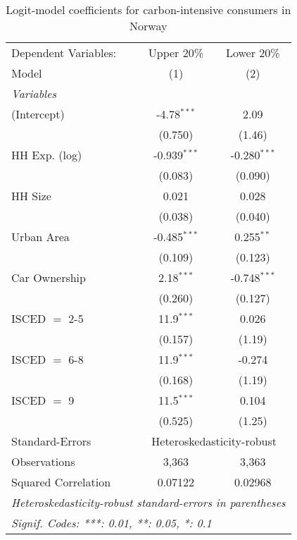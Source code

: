 
\begin{table}[htbp!]
   \centering
   \small
   \begin{adjustbox}{width = 1\textwidth, max height = 0.95\textheight, center}
      \begin{threeparttable}[b]
         \caption{\label{tab:Logit_1_NOR} Logit-model coefficients for carbon-intensive consumers in Norway}
         \begin{tabular}{lcc}
            \tabularnewline \midrule \midrule
            Dependent Variables: & Upper 20\%     & Lower 20\%\\   
            Model                & (1)            & (2)\\  
            \midrule
            \emph{Variables}\\
            (Intercept)          & -4.78$^{***}$  & 2.09\\   
                                 & (0.750)        & (1.46)\\   
            HH Exp. (log)        & -0.939$^{***}$ & -0.280$^{***}$\\   
                                 & (0.083)        & (0.090)\\   
            HH Size              & 0.021          & 0.028\\   
                                 & (0.038)        & (0.040)\\   
            Urban Area           & -0.485$^{***}$ & 0.255$^{**}$\\   
                                 & (0.109)        & (0.123)\\   
            Car Ownership        & 2.18$^{***}$   & -0.748$^{***}$\\   
                                 & (0.260)        & (0.127)\\   
            ISCED $=$ 2-5        & 11.9$^{***}$   & 0.026\\   
                                 & (0.157)        & (1.19)\\   
            ISCED $=$ 6-8        & 11.9$^{***}$   & -0.274\\   
                                 & (0.168)        & (1.19)\\   
            ISCED $=$ 9          & 11.5$^{***}$   & 0.104\\   
                                 & (0.525)        & (1.25)\\   
            \midrule 
            Standard-Errors & \multicolumn{2}{c}{Heteroskedasticity-robust} \\ 
            Observations         & 3,363          & 3,363\\  
            Squared Correlation  & 0.07122        & 0.02968\\  
            \midrule \midrule
            \multicolumn{3}{l}{\emph{Heteroskedasticity-robust standard-errors in parentheses}}\\
            \multicolumn{3}{l}{\emph{Signif. Codes: ***: 0.01, **: 0.05, *: 0.1}}\\
         \end{tabular}
         

\end{threeparttable}
\end{adjustbox}
\end{table}
